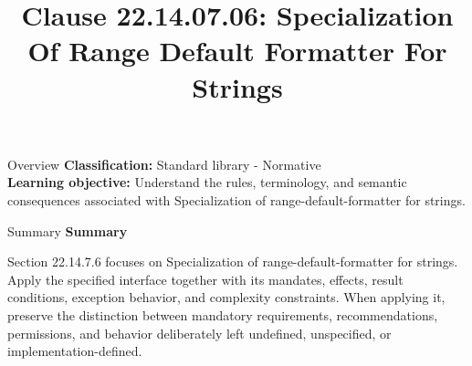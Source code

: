 \documentclass[10pt,letterpaper]{article}
\title{Clause 22.14.07.06: Specialization Of Range Default Formatter For Strings}
\author{}
\date{}
\begin{document}
\maketitle
\begin{CornellOverviewBox}{Overview}
\textbf{Classification:} Standard library - Normative\\[2pt]
\textbf{Learning objective:} Understand the rules, terminology, and semantic consequences associated with Specialization of range-default-formatter for strings.
\end{CornellOverviewBox}\begin{CornellSummaryBox}{Summary}
{\sffamily\bfseries\color{Accent} Summary}\par\vspace{3pt}Section 22.14.7.6 focuses on Specialization of range-default-formatter for strings. Apply the specified interface together with its mandates, effects, result conditions, exception behavior, and complexity constraints. When applying it, preserve the distinction between mandatory requirements, recommendations, permissions, and behavior deliberately left undefined, unspecified, or implementation-defined.
\end{CornellSummaryBox}
\end{document}
